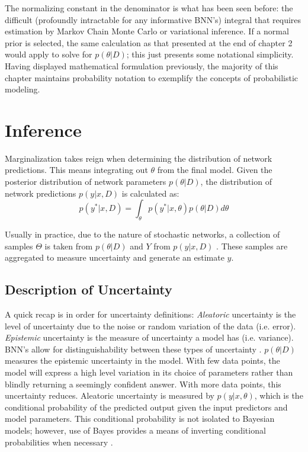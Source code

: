 The normalizing constant in the denominator is what has been seen before: the difficult (profoundly intractable for any informative BNN's) integral that requires estimation by Markov Chain Monte Carlo or variational inference.  If a normal prior is selected, the same calculation as that presented at the end of chapter 2 would apply to solve for $p(\theta|D)$; this just presents some notational simplicity.  Having displayed mathematical formulation previously, the majority of this chapter maintains probability notation to exemplify the concepts of probabilistic modeling.



\section{Inference}

Marginalization takes reign when determining the distribution of network predictions.  This means integrating out $\theta$ from the final model.  Given the posterior distribution of network parameters $p(\theta|D)$, the distribution of network predictions $p(y|x,D)$ is calculated as:
$$
p(y^*|x,D) = \int_\theta p(y^*|x,\theta)p(\theta|D)d\theta
$$

Usually in practice, due to the nature of stochastic networks, a collection of samples $\Theta$ is taken from $p(\theta|D)$ and $Y$ from $p(y|x,D)$ \cite{Jospin}. These samples are aggregated to measure uncertainty and generate an estimate $\hat{y}$.

\subsection{Description of Uncertainty}

A quick recap is in order for uncertainty definitions: \textit{Aleatoric} uncertainty is the level of uncertainty due to the noise or random variation of the data (i.e. error).  \textit{Epistemic} uncertainty is the measure of uncertainty a model has (i.e. variance).  BNN's allow for distinguishability between these types of uncertainty \cite{Jospin}.  $p(\theta|D)$ measures the epistemic uncertainty in the model.  With few data points, the model will express a high level variation in its choice of parameters rather than blindly returning a seemingly confident answer.  With more data points, this uncertainty reduces.
Aleatoric uncertainty is measured by $p(y|x,\theta)$, which is the conditional probability of the predicted output given the input predictors and model parameters.  This conditional probability is not isolated to Bayesian models; however, use of Bayes provides a means of inverting conditional probabilities when necessary \cite{Jospin}.


